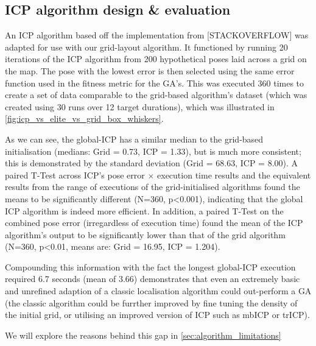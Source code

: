 \documentclass[authoryearcitations]{UoYCSproject}
\begin{document}
\subsection{ICP algorithm design \& evaluation}
An ICP algorithm based off the implementation from [STACKOVERFLOW] was adapted for use with our grid-layout algorithm. It functioned by running 20 iterations of the ICP algorithm from 200 hypothetical poses laid across a grid on the map. The pose with the lowest error is then selected using the same error function used in the fitness metric for the GA's. This was executed 360 times to create a set of data comparable to the grid-based algorithm's dataset (which was created using 30 runs over 12 target durations), which was illustrated in \autoref{fig:icp_vs_elite_vs_grid_box_whiskers}. 

As we can see, the global-ICP has a similar median to the grid-based initialisation (medians: Grid = 0.73, ICP = 1.33), but is much more consistent; this is demonstrated by the standard deviation (Grid = 68.63, ICP = 8.00). A paired T-Test across ICP's pose error $\times$ execution time results and the equivalent results from the range of executions of the grid-initialised algorithms found the means to be significantly different (N=360, p<0.001), indicating that the global ICP algorithm is indeed more efficient. In addition, a paired T-Test on the combined pose error (irregardless of execution time) found the mean of the ICP algorithm's output to be significantly lower than that of the grid algorithm (N=360, p<0.01, means are: Grid = 16.95, ICP = 1.204). 

Compounding this information with the fact the longest global-ICP execution required 6.7 seconds (mean of 3.66) demonstrates that even an extremely basic and unrefined adaption of a classic localisation algorithm could out-perform a GA (the classic algorithm could be furrther improved by fine tuning the density of the initial grid, or utilising an improved version of ICP such as mbICP or trICP).

We will explore the reasons behind this gap in \autoref{sec:algorithm_limitations}
\end{document}

